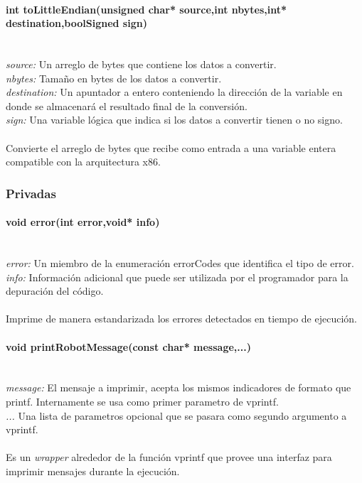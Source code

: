 \documentclass[letterpaper,openright,12pt]{book}
\begin{document}
\paragraph{int toLittleEndian(unsigned char* source,int nbytes,int* destination,boolSigned sign)}\mbox{}\\
\emph{source: }Un arreglo de bytes que contiene los datos a convertir.\\
\emph{nbytes: }Tamaño en bytes de los datos a convertir.\\
\emph{destination: }Un apuntador a entero conteniendo la dirección de la variable en donde se almacenará el resultado final de la conversión.\\
\emph{sign: }Una variable lógica que indica si los datos a convertir tienen o no signo.\\\\
Convierte el arreglo de bytes que recibe como entrada a una variable entera compatible con la arquitectura x86.

\subsubsection{Privadas}
\paragraph{void error(int error,void* info)}\mbox{}\\
\emph{error: } Un miembro de la enumeración errorCodes 	que identifica el tipo de error.\\
\emph{info: } Información adicional que puede ser utilizada por el programador para la depuración del código.\\\\
Imprime de manera estandarizada los errores detectados en tiempo de ejecución.\\



 \paragraph{void printRobotMessage(const char* message,...)}\mbox{}\\
 \emph{message: }El mensaje a imprimir, acepta los mismos indicadores de formato que printf. Internamente se usa como primer parametro de vprintf.\\
 \emph{... }Una lista de parametros opcional que se pasara como segundo argumento a vprintf.\\\\
 Es un \emph{wrapper} alrededor de la función vprintf que provee una interfaz para imprimir mensajes durante la ejecución.\\
\end{document}
